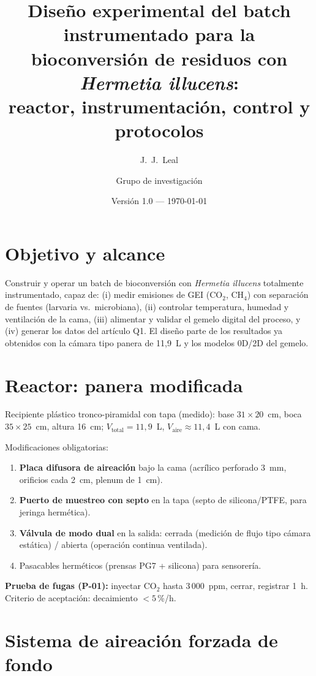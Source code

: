\documentclass[11pt,a4paper]{article}
\title{Diseño experimental del batch instrumentado para la\\
bioconversión de residuos con \emph{Hermetia illucens}:\\
reactor, instrumentación, control y protocolos}
\author{J.~J.~Leal \and Grupo de investigación}
\date{Versión 1.0 --- \today}
\begin{document}
\maketitle
\tableofcontents
\newpage

\section{Objetivo y alcance}

Construir y operar un batch de bioconversión con \emph{Hermetia illucens}
totalmente instrumentado, capaz de: (i) medir emisiones de GEI
(CO$_2$, CH$_4$) con separación de fuentes (larvaria vs.\ microbiana),
(ii) controlar temperatura, humedad y ventilación de la cama,
(iii) alimentar y validar el gemelo digital del proceso, y
(iv) generar los datos del artículo Q1.
El diseño parte de los resultados ya obtenidos con la cámara
tipo panera de 11{,}9~L y los modelos 0D/2D del gemelo.

\section{Reactor: panera modificada}

Recipiente plástico tronco-piramidal con tapa (medido):
base $31\times20$~cm, boca $35\times25$~cm, altura 16~cm;
$V_\text{total}=11{,}9$~L, $V_\text{aire}\approx11{,}4$~L con cama.

Modificaciones obligatorias:
\begin{enumerate}
  \item \textbf{Placa difusora de aireación} bajo la cama
        (acrílico perforado 3~mm, orificios cada 2~cm, plenum de 1~cm).
  \item \textbf{Puerto de muestreo con septo} en la tapa
        (septo de silicona/PTFE, para jeringa hermética).
  \item \textbf{Válvula de modo dual} en la salida:
        cerrada (medición de flujo tipo cámara estática) /
        abierta (operación continua ventilada).
  \item Pasacables herméticos (prensas PG7 + silicona) para sensorería.
\end{enumerate}

\textbf{Prueba de fugas (P-01):} inyectar CO$_2$ hasta 3\,000~ppm,
cerrar, registrar 1~h. Criterio de aceptación: decaimiento $<5$\,\%/h.

\section{Sistema de aireación forzada de fondo}
\end{document}
